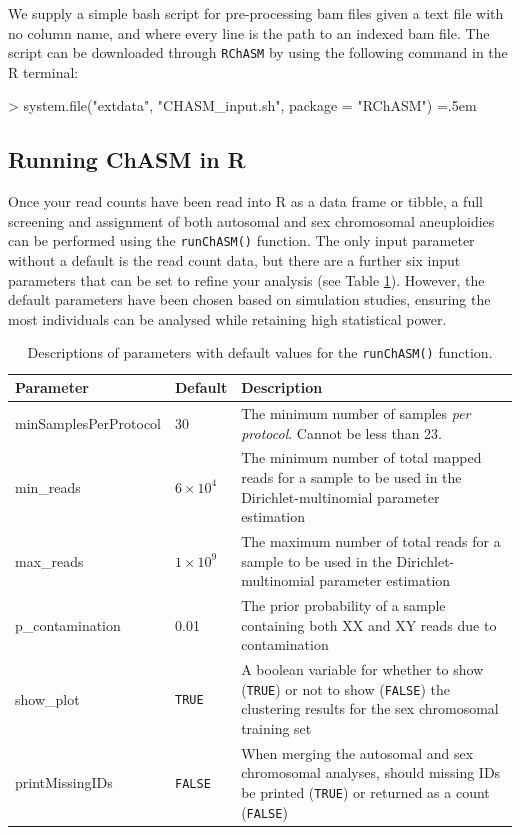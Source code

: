 \documentclass[10pt,a4paper]{article}
\newenvironment{cverbatim1}
 {\SaveVerbatim{cverb}}
 {\endSaveVerbatim
    \relsize{-1}\fboxrule=0pt\fboxsep=.5em
  \colorbox{cverbbg}{\BUseVerbatim{cverb}}%
}
\begin{document}
We supply a simple bash script for pre-processing bam files given a text file with no column name, and where every line is the path to an indexed bam file. The script can be downloaded through \texttt{RChASM} by using the following command in the R terminal:

\begin{cverbatim1}
> system.file("extdata", "CHASM_input.sh", package = "RChASM")
\end{cverbatim1}

\subsection{Running ChASM in R}

Once your read counts have been read into R as a data frame or tibble, a full screening and assignment of both autosomal and sex chromosomal aneuploidies can be performed using the \texttt{runChASM()} function. The only input parameter without a default is the read count data, but there are a further six input parameters that can be set to refine your analysis (see Table \ref{tab:runChASM}). However, the default parameters have been chosen based on simulation studies, ensuring the most individuals can be analysed while retaining high statistical power\cite{rohrlach2026chasm}.

\begin{table}[htbp]
    \centering
    \begin{tabular}{|m{4.5cm}|m{1.5cm}|>{\raggedright\arraybackslash}m{8.5cm}|} \hline
       \textbf{Parameter} & \textbf{Default} & \textbf{Description} \\ \hline
       minSamplesPerProtocol & 30 & The minimum number of samples \textit{per protocol}. Cannot be less than 23. \\ \hline
       min\_reads & $6\times 10^{4}$ & The minimum number of total mapped reads for a sample to be used in the Dirichlet-multinomial parameter estimation \\ \hline
       max\_reads & $1\times 10^{9}$ & The maximum number of total reads for a sample to be used in the Dirichlet-multinomial parameter estimation \\ \hline
       p\_contamination & 0.01 & The prior probability of a sample containing both XX and XY reads due to contamination \\\hline
       show\_plot & \texttt{TRUE} & A boolean variable for whether to show (\texttt{TRUE}) or not to show (\texttt{FALSE}) the clustering results for the sex chromosomal training set \\\hline
       printMissingIDs & \texttt{FALSE} & When merging the autosomal and sex chromosomal analyses, should missing IDs be printed (\texttt{TRUE}) or returned as a count (\texttt{FALSE}) \\\hline
    \end{tabular}
    \caption{Descriptions of parameters with default values for the \texttt{runChASM()} function.}
    \label{tab:runChASM}
\end{table}
\end{document}
